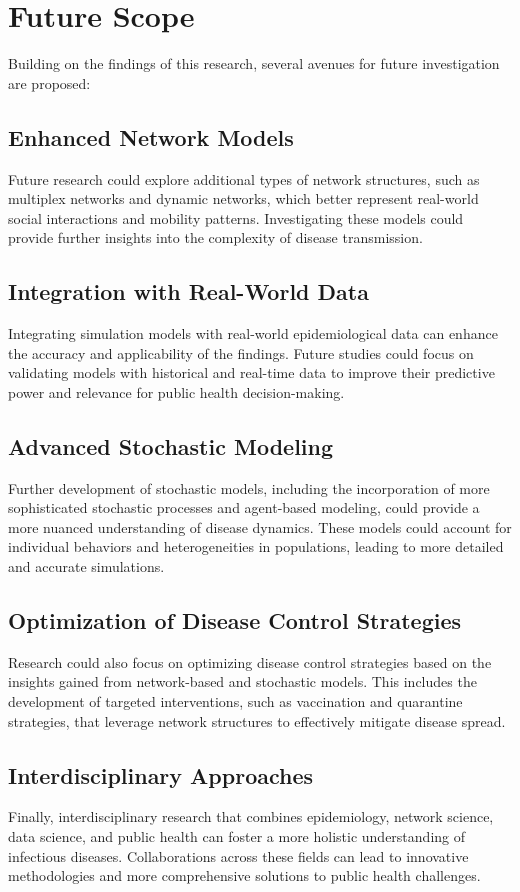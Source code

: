 \section{Future Scope}
Building on the findings of this research, several avenues for future investigation are proposed:

\subsection{Enhanced Network Models}
Future research could explore additional types of network structures, such as multiplex networks and dynamic networks, which better represent real-world social interactions and mobility patterns. Investigating these models could provide further insights into the complexity of disease transmission.

\subsection{Integration with Real-World Data}
Integrating simulation models with real-world epidemiological data can enhance the accuracy and applicability of the findings. Future studies could focus on validating models with historical and real-time data to improve their predictive power and relevance for public health decision-making.

\subsection{Advanced Stochastic Modeling}
Further development of stochastic models, including the incorporation of more sophisticated stochastic processes and agent-based modeling, could provide a more nuanced understanding of disease dynamics. These models could account for individual behaviors and heterogeneities in populations, leading to more detailed and accurate simulations.

\subsection{Optimization of Disease Control Strategies}
Research could also focus on optimizing disease control strategies based on the insights gained from network-based and stochastic models. This includes the development of targeted interventions, such as vaccination and quarantine strategies, that leverage network structures to effectively mitigate disease spread.

\subsection{Interdisciplinary Approaches}
Finally, interdisciplinary research that combines epidemiology, network science, data science, and public health can foster a more holistic understanding of infectious diseases. Collaborations across these fields can lead to innovative methodologies and more comprehensive solutions to public health challenges.

